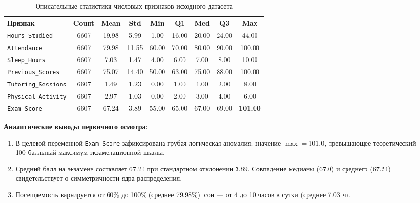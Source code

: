 \documentclass[14pt,a4paper]{extarticle}
\begin{document}
\begin{table}[H]
    \centering
    \caption{Описательные статистики числовых признаков исходного датасета}
    \label{tab:initial_numeric_stats}
    \fontsize{8.5pt}{10.5pt}\selectfont
    \begin{tabularx}{\textwidth}{|>{\raggedright\arraybackslash}p{3.5cm}|c|c|c|c|c|c|c|c|}
        \hline
        \textbf{Признак} & \textbf{Count} & \textbf{Mean} & \textbf{Std} & \textbf{Min} & \textbf{Q1} & \textbf{Med} & \textbf{Q3} & \textbf{Max} \\
        \hline
        \texttt{Hours\_Studied} & 6607 & 19.98 & 5.99 & 1.00 & 16.00 & 20.00 & 24.00 & 44.00 \\
        \hline
        \texttt{Attendance} & 6607 & 79.98 & 11.55 & 60.00 & 70.00 & 80.00 & 90.00 & 100.00 \\
        \hline
        \texttt{Sleep\_Hours} & 6607 & 7.03 & 1.47 & 4.00 & 6.00 & 7.00 & 8.00 & 10.00 \\
        \hline
        \texttt{Previous\_Scores} & 6607 & 75.07 & 14.40 & 50.00 & 63.00 & 75.00 & 88.00 & 100.00 \\
        \hline
        \texttt{Tutoring\_Sessions} & 6607 & 1.49 & 1.23 & 0.00 & 1.00 & 1.00 & 2.00 & 8.00 \\
        \hline
        \texttt{Physical\_Activity} & 6607 & 2.97 & 1.03 & 0.00 & 2.00 & 3.00 & 4.00 & 6.00 \\
        \hline
        \texttt{Exam\_Score} & 6607 & 67.24 & 3.89 & 55.00 & 65.00 & 67.00 & 69.00 & \textbf{101.00} \\
        \hline
    \end{tabularx}
\end{table}

\textbf{Аналитические выводы первичного осмотра:}
\begin{enumerate}
    \item В целевой переменной \texttt{Exam\_Score} зафиксирована грубая логическая аномалия: значение $\max = 101.0$, превышающее теоретический 100-балльный максимум экзаменационной шкалы.
    \item Средний балл на экзамене составляет $67.24$ при стандартном отклонении $3.89$. Совпадение медианы ($67.0$) и среднего ($67.24$) свидетельствует о симметричности ядра распределения.
    \item Посещаемость варьируется от 60\% до 100\% (среднее 79.98\%), сон --- от 4 до 10 часов в сутки (среднее 7.03 ч).
\end{enumerate}
\end{document}
